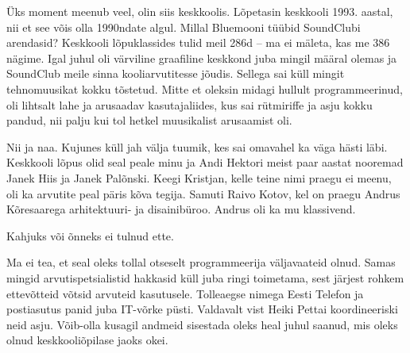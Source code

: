 Üks moment meenub veel, olin siis keskkoolis. 
Lõpetasin keskkooli 1993. aastal, nii et see võis olla 1990ndate algul. Millal 
Bluemooni tüübid SoundClubi arendasid? Keskkooli lõpuklassides 
tulid meil 286d -- ma ei mäleta, kas me 386 nägime. 
Igal juhul oli värviline graafiline keskkond juba mingil määral olemas ja 
SoundClub meile sinna kooliarvutitesse jõudis. Sellega sai küll mingit 
tehnomuusikat kokku tõstetud. Mitte et oleksin midagi hullult programmeerinud, oli lihtsalt lahe ja arusaadav kasutajaliides, kus sai
rütmiriffe ja asju kokku pandud, nii palju kui tol hetkel 
muusikalist arusaamist oli.


Nii ja naa. Kujunes küll jah välja tuumik, kes sai omavahel ka väga 
hästi läbi. Keskkooli lõpus olid seal peale 
minu ja Andi Hektori meist paar aastat 
nooremad Janek Hiis ja Janek 
Palõnski. Keegi Kristjan, kelle teine 
nimi praegu ei meenu, oli ka arvutite peal päris kõva tegija. Samuti Raivo 
Kotov, kel on praegu Andrus 
Kõresaarega arhitektuuri- ja 
disainibüroo. Andrus oli ka mu klassivend.


Kahjuks või õnneks ei tulnud ette. 


Ma ei tea, et seal oleks tollal otseselt programmeerija väljavaateid 
olnud. Samas mingid arvutispetsialistid hakkasid küll juba ringi 
toimetama, sest järjest rohkem ettevõtteid võtsid arvuteid kasutusele. Tolleaegse nimega 
Eesti Telefon ja postiasutus panid juba IT-võrke püsti. Valdavalt vist Heiki 
Pettai koordineeriski neid asju. Võib-olla kusagil andmeid sisestada oleks 
heal juhul saanud, mis oleks olnud keskkooliõpilase jaoks okei. 


